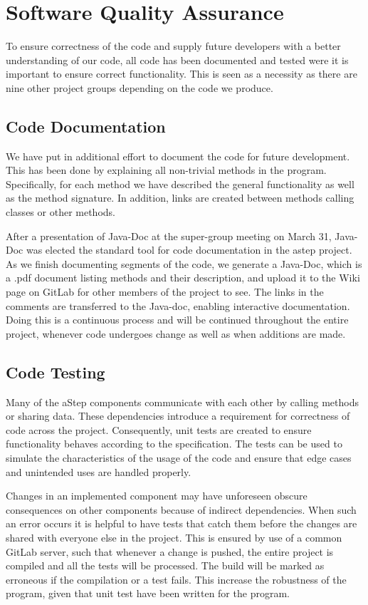 \section{Software Quality Assurance}\label{sec:unit_test}
To ensure correctness of the code and supply future developers with a better understanding of our code, all code has been documented and tested were it is important to ensure correct functionality. This is seen as a necessity as there are nine other project groups depending on the code we produce.

\subsection{Code Documentation} \label{sec:code_documentation}
We have put in additional effort to document the code for future development. This has been done by explaining all non-trivial methods in the program. Specifically, for each method we have described the general functionality as well as the method signature. In addition, links are created between methods calling classes or other methods. 

After a presentation of Java-Doc at the super-group meeting on March 31, Java-Doc was elected the standard tool for code documentation in the astep project.
As we finish documenting segments of the code, we generate a Java-Doc, which is a .pdf document listing methods and their description, and upload it to the Wiki page on GitLab for other members of the project to see. The links in the comments are transferred to the Java-doc, enabling interactive documentation. 
Doing this is a continuous process and will be continued throughout the entire project, whenever code undergoes change as well as when additions are made.


\subsection{Code Testing}
Many of the aStep components communicate with each other by calling methods or sharing data. These dependencies introduce a requirement for correctness of code across the project. Consequently, unit tests are created to ensure functionality behaves according to the specification. The tests can be used to simulate the characteristics of the usage of the code and ensure that edge cases and unintended uses are handled properly. 

Changes in an implemented component may have unforeseen obscure consequences on other components because of indirect dependencies. When such an error occurs it is helpful to have tests that catch them before the changes are shared with everyone else in the project. This is ensured by use of a common GitLab server, such that whenever a change is pushed, the entire project is compiled and all the tests will be processed. The build will be marked as erroneous if the compilation or a test fails. This increase the robustness of the program, given that unit test have been written for the program.

